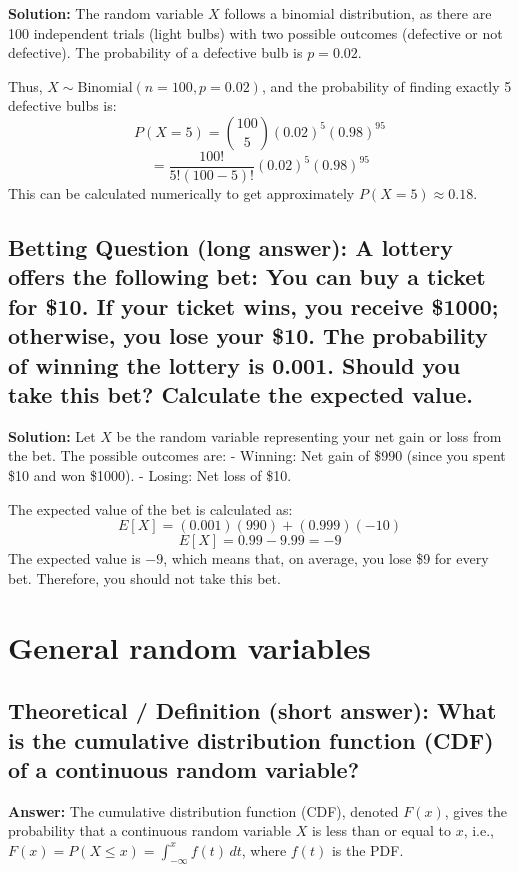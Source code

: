 \documentclass[12pt]{article}
\begin{document}
\textbf{Solution:}  
The random variable \( X \) follows a binomial distribution, as there are 100 independent trials (light bulbs) with two possible outcomes (defective or not defective). The probability of a defective bulb is \( p = 0.02 \).

Thus, \( X \sim \text{Binomial}(n = 100, p = 0.02) \), and the probability of finding exactly 5 defective bulbs is:
\[
P(X = 5) = \binom{100}{5} (0.02)^5 (0.98)^{95}
\]
\[
= \frac{100!}{5!(100-5)!} (0.02)^5 (0.98)^{95}
\]
This can be calculated numerically to get approximately \( P(X = 5) \approx 0.18 \).

\subsection{Betting Question (long answer): A lottery offers the following bet: You can buy a ticket for \$10. If your ticket wins, you receive \$1000; otherwise, you lose your \$10. The probability of winning the lottery is 0.001. Should you take this bet? Calculate the expected value.}

\textbf{Solution:}  
Let \( X \) be the random variable representing your net gain or loss from the bet. The possible outcomes are:
- Winning: Net gain of \$990 (since you spent \$10 and won \$1000).
- Losing: Net loss of \$10.

The expected value of the bet is calculated as:
\[
E[X] = (0.001)(990) + (0.999)(-10)
\]
\[
E[X] = 0.99 - 9.99 = -9
\]
The expected value is \( -9 \), which means that, on average, you lose \$9 for every bet. Therefore, you should not take this bet.



\section{General random variables}


\subsection{Theoretical / Definition (short answer): What is the cumulative distribution function (CDF) of a continuous random variable?}

\textbf{Answer:} The cumulative distribution function (CDF), denoted \( F(x) \), gives the probability that a continuous random variable \( X \) is less than or equal to \( x \), i.e., \( F(x) = P(X \leq x) = \int_{-\infty}^{x} f(t) \, dt \), where \( f(t) \) is the PDF.
\end{document}
